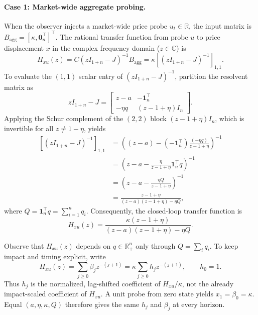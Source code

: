 \documentclass[10pt,twocolumn,letterpaper]{article}
\theoremstyle{definition}
\theoremstyle{remark}
\begin{document}
\paragraph{Case 1: Market-wide aggregate probing.}
When the observer injects a market-wide price probe $u_t\in\mathbb{R}$, the input matrix is $B_{\mathrm{agg}}=[\kappa, \mathbf0_n^\top]^\top$. The rational transfer function from probe $u$ to price displacement $x$ in the complex frequency domain ($z\in\mathbb{C}$) is
\begin{equation}
 H_{xu}(z)=C(zI_{1+n}-J)^{-1}B_{\mathrm{agg}}=\kappa\left[(zI_{1+n}-J)^{-1}\right]_{1,1}.
\end{equation}
To evaluate the $(1,1)$ scalar entry of $(zI_{1+n}-J)^{-1}$, partition the resolvent matrix as
\begin{equation}
 zI_{1+n}-J=\begin{bmatrix} z-a & -\mathbf1_n^\top \\ -\eta q & (z-1+\eta)I_n \end{bmatrix}.
\end{equation}
Applying the Schur complement of the $(2,2)$ block $(z-1+\eta)I_n$, which is invertible for all $z\ne 1-\eta$, yields
\begin{align}
 \left[(zI_{1+n}-J)^{-1}\right]_{1,1}
 &=\left((z-a)-(-\mathbf1_n^\top)\frac{(-\eta q)}{z-1+\eta}\right)^{-1}\\
 &=\left(z-a-\frac{\eta}{z-1+\eta}\mathbf1_n^\top q\right)^{-1}\\
 &=\left(z-a-\frac{\eta Q}{z-1+\eta}\right)^{-1}\\
 &=\frac{z-1+\eta}{(z-a)(z-1+\eta)-\eta Q},
\end{align}
where $Q=\mathbf1_n^\top q=\sum_{i=1}^n q_i$. Consequently, the closed-loop transfer function is
\begin{equation}
 H_{xu}(z)=\frac{\kappa(z-1+\eta)}{(z-a)(z-1+\eta)-\eta Q}.
 \label{eq:resolvent_transfer_proof}
\end{equation}

Observe that $H_{xu}(z)$ depends on $q\in\mathbb R_+^n$ only through $Q=\sum_iq_i$. To keep impact and timing explicit, write
\[
 H_{xu}(z)=\sum_{j\ge0}\beta_jz^{-(j+1)}
          =\kappa\sum_{j\ge0}h_jz^{-(j+1)},\qquad h_0=1.
\]
Thus $h_j$ is the normalized, lag-shifted coefficient of $H_{xu}/\kappa$, not the already impact-scaled coefficient of $H_{xu}$. A unit probe from zero state yields $x_1=\beta_0=\kappa$. Equal $(a,\eta,\kappa,Q)$ therefore gives the same $h_j$ and $\beta_j$ at every horizon.
\end{document}
